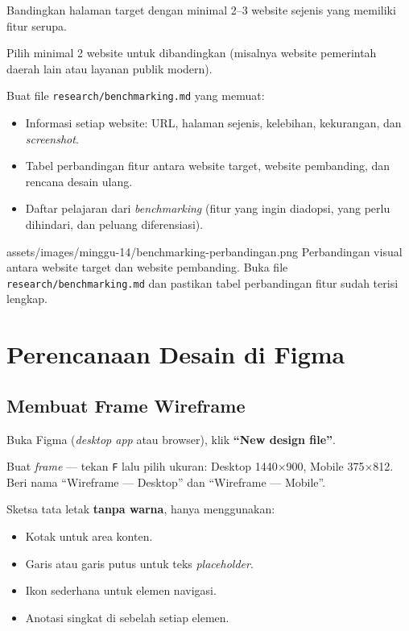 Bandingkan halaman target dengan minimal 2--3 website sejenis yang memiliki fitur serupa.

\begin{langkah}
  \item Pilih minimal 2 website untuk dibandingkan (misalnya website pemerintah daerah lain atau layanan publik modern).
  \item Buat file \texttt{research/benchmarking.md} yang memuat:
  \begin{itemize}
    \item Informasi setiap website: URL, halaman sejenis, kelebihan, kekurangan, dan \emph{screenshot}.
    \item Tabel perbandingan fitur antara website target, website pembanding, dan rencana desain ulang.
    \item Daftar pelajaran dari \emph{benchmarking} (fitur yang ingin diadopsi, yang perlu dihindari, dan peluang diferensiasi).
  \end{itemize}
\end{langkah}

\begin{tangkapanlayar}
  {assets/images/minggu-14/benchmarking-perbandingan.png}
  {Perbandingan visual antara website target dan website pembanding.}
  {Buka file \texttt{research/benchmarking.md} dan pastikan tabel perbandingan fitur sudah terisi lengkap.}
\end{tangkapanlayar}

\section{Perencanaan Desain di Figma}
\label{sec:desain-figma}

\subsection{Membuat Frame Wireframe}
\label{subsec:wireframe}

\begin{langkah}
  \item Buka Figma (\emph{desktop app} atau browser), klik \textbf{``New design file''}.
  \item Buat \emph{frame} --- tekan \texttt{F} lalu pilih ukuran: Desktop 1440$\times$900, Mobile 375$\times$812. Beri nama ``Wireframe --- Desktop'' dan ``Wireframe --- Mobile''.
  \item Sketsa tata letak \textbf{tanpa warna}, hanya menggunakan:
  \begin{itemize}
    \item Kotak untuk area konten.
    \item Garis atau garis putus untuk teks \emph{placeholder}.
    \item Ikon sederhana untuk elemen navigasi.
    \item Anotasi singkat di sebelah setiap elemen.
  \end{itemize}
\end{langkah}

